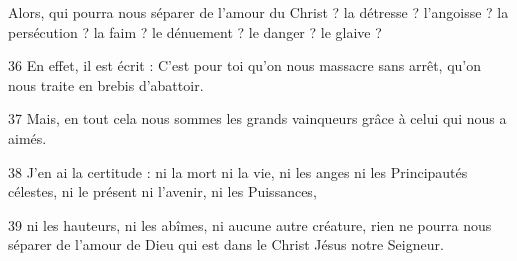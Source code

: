 
Alors, qui pourra nous séparer de l’amour du Christ ? la détresse ? l’angoisse ? la persécution ? la faim ? le dénuement ? le danger ? le glaive ?

36 En effet, il est écrit : C’est pour toi qu’on nous massacre sans arrêt, qu’on nous traite en brebis d’abattoir.

37 Mais, en tout cela nous sommes les grands vainqueurs grâce à celui qui nous a aimés.

38 J’en ai la certitude : ni la mort ni la vie, ni les anges ni les Principautés célestes, ni le présent ni l’avenir, ni les Puissances,

39 ni les hauteurs, ni les abîmes, ni aucune autre créature, rien ne pourra nous séparer de l’amour de Dieu qui est dans le Christ Jésus notre Seigneur.